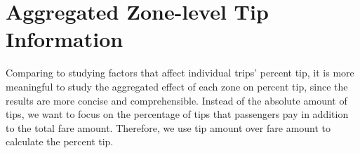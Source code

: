 \documentclass[12pt,twoside]{reedthesis}
\newenvironment{Shaded}{\begin{snugshade}}{\end{snugshade}}
\newcommand{\KeywordTok}[1]{\textcolor[rgb]{0.13,0.29,0.53}{\textbf{#1}}}
\newcommand{\DataTypeTok}[1]{\textcolor[rgb]{0.13,0.29,0.53}{#1}}
\newcommand{\DecValTok}[1]{\textcolor[rgb]{0.00,0.00,0.81}{#1}}
\newcommand{\StringTok}[1]{\textcolor[rgb]{0.31,0.60,0.02}{#1}}
\newcommand{\OperatorTok}[1]{\textcolor[rgb]{0.81,0.36,0.00}{\textbf{#1}}}
\newcommand{\NormalTok}[1]{#1}
\theoremstyle{definition}
\theoremstyle{definition}
\theoremstyle{definition}
\theoremstyle{remark}
\begin{document}
\section{Aggregated Zone-level Tip
Information}\label{aggregated-zone-level-tip-information}

Comparing to studying factors that affect individual trips' percent tip,
it is more meaningful to study the aggregated effect of each zone on
percent tip, since the results are more concise and comprehensible.
Instead of the absolute amount of tips, we want to focus on the
percentage of tips that passengers pay in addition to the total fare
amount. Therefore, we use tip amount over fare amount to calculate the
percent tip.
\begin{Shaded}
\end{Shaded}
\end{document}

